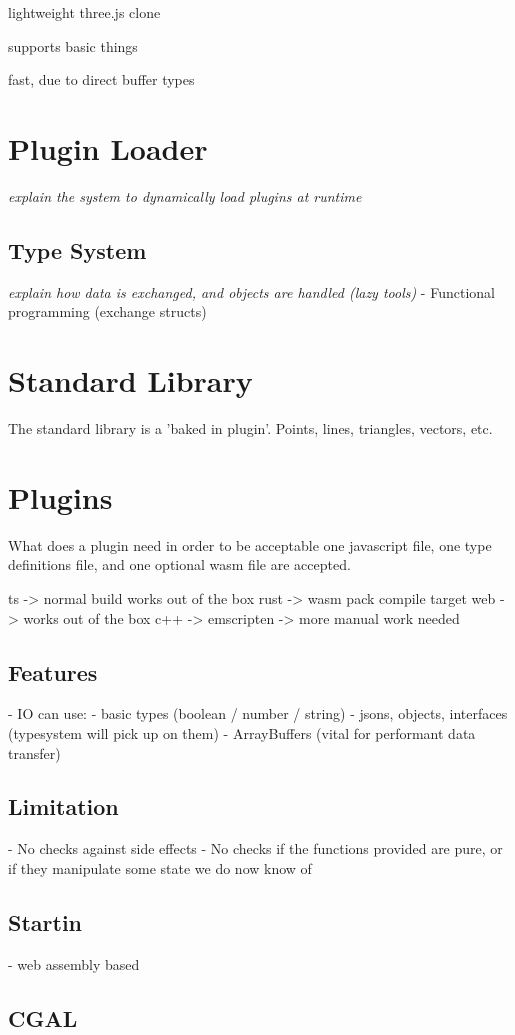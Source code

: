 lightweight three.js clone

supports basic things

fast, due to direct buffer types

\section{ Plugin Loader } 

\emph{explain the system to dynamically load plugins at runtime}

\subsection{ Type System }

\emph{explain how data is exchanged, and objects are handled (lazy tools)}
- Functional programming (exchange structs)

\section{ Standard Library }

The standard library is a 'baked in plugin'.
Points, lines, triangles, vectors, etc.

\section{ Plugins }
What does a plugin need in order to be acceptable
one javascript file, one type definitions file, and one optional wasm file are accepted. 

ts -> normal build works out of the box
rust -> wasm pack compile target web -> works out of the box 
c++ -> emscripten -> more manual work needed 

\subsection{Features}
- IO can use:
  - basic types (boolean / number / string)
  - jsons, objects, interfaces (typesystem will pick up on them)
  - ArrayBuffers (vital for performant data transfer)

\subsection{Limitation}
- No checks against side effects 
  - No checks if the functions provided are pure, or if they manipulate some state we do now know of




\subsection{ Startin }

- web assembly based

\subsection{ CGAL }

